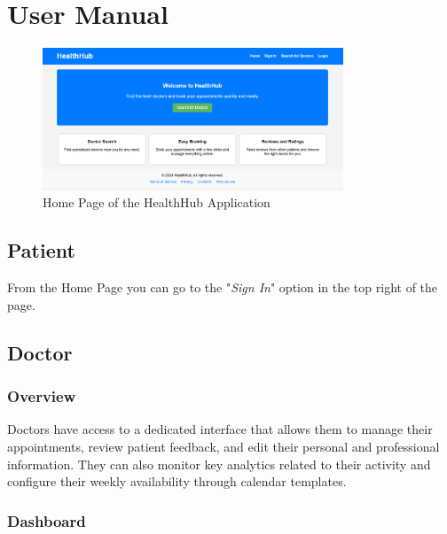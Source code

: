 \chapter{User Manual}

\begin{figure}[H]
	\centering
	\includegraphics[width=0.8\textwidth]{resources/homepage.png}
	\caption{Home Page of the HealthHub Application}
	\label{fig:homepage}
\end{figure}

\section{Patient}
From the Home Page you can go to the "\textit{Sign In}" option in the top right of the page. 


\section{Doctor}

\subsection{Overview}
Doctors have access to a dedicated interface that allows them to manage their appointments, review patient feedback, and edit their personal and professional information. They can also monitor key analytics related to their activity and configure their weekly availability through calendar templates.

\subsection{Dashboard}


